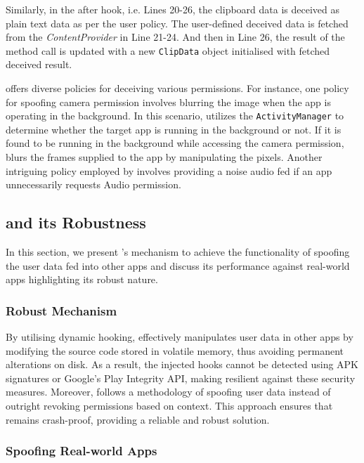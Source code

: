 Similarly, in the after hook, i.e. Lines 20-26, the clipboard data is deceived as plain text data as per the user policy. The user-defined deceived data is fetched from the \textit{ContentProvider} in Line 21-24. And then in Line 26, the result of the method call is updated with a new \texttt{ClipData} object initialised with fetched deceived result.

\framework{} offers diverse policies for deceiving various permissions. For instance, one policy for spoofing camera permission involves blurring the image when the app is operating in the background. In this scenario, \framework{} utilizes the \texttt{ActivityManager} to determine whether the target app is running in the background or not. If it is found to be running in the background while accessing the camera permission, \framework{} blurs the frames supplied to the app by manipulating the pixels. Another intriguing policy employed by \framework{} involves providing a noise audio fed if an app unnecessarily requests Audio permission.

\subsection{\framework{} and its Robustness}
In this section, we present \framework{}'s mechanism to achieve the functionality of spoofing the user data fed into other apps and discuss its performance against real-world apps highlighting its robust nature.

\subsubsection{Robust Mechanism} 

By utilising dynamic hooking, \framework{} effectively manipulates user data in other apps by modifying the source code stored in volatile memory, thus avoiding permanent alterations on disk. As a result, the injected hooks cannot be detected using APK signatures or Google's Play Integrity API, making \framework{} resilient against these security measures. Moreover, \framework{} follows a methodology of spoofing user data instead of outright revoking permissions based on context. This approach ensures that \framework{} remains crash-proof, providing a reliable and robust solution.

\subsubsection{Spoofing Real-world Apps}

